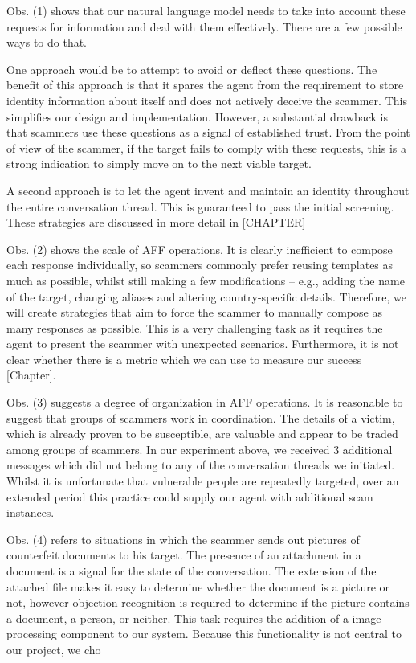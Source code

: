 Obs. (1) shows that our natural language model needs to take into account these requests for information and deal with them effectively. There are a few possible ways to do that. 

One approach would be to attempt to avoid or deflect these questions. The benefit of this approach is that it spares the agent from the requirement to store identity information about itself and does not actively deceive the scammer. This simplifies our design and implementation. However, a substantial drawback is that scammers use these questions as a signal of established trust. From the point of view of the scammer, if the target fails to comply with these requests, this is a strong indication to simply move on to the next viable target. 

A second approach is to let the agent invent and maintain an identity throughout the entire conversation thread. This is guaranteed to pass the initial screening. These strategies are discussed in more detail in [CHAPTER]

Obs. (2) shows the scale of AFF operations. It is clearly inefficient to compose each response individually, so scammers commonly prefer reusing templates as much as possible, whilst still making a few modifications -- e.g., adding the name of the target, changing aliases and altering country-specific details. Therefore, we will create strategies that aim to force the scammer to manually compose as many responses as possible. This is a very challenging task as it requires the agent to present the scammer with unexpected scenarios. Furthermore, it is not clear whether there is a metric which we can use to measure our success [Chapter].

Obs. (3) suggests a degree of organization in AFF operations. It is reasonable to suggest that groups of scammers work in coordination. The details of a victim, which is already proven to be susceptible, are valuable and appear to be traded among groups of scammers. In our experiment above, we received 3 additional messages which did not belong to any of the conversation threads we initiated. Whilst it is unfortunate that vulnerable people are repeatedly targeted, over an extended period this practice could supply our agent with additional scam instances. 

Obs. (4) refers to situations in which the scammer sends out pictures of counterfeit documents to his target. The presence of an attachment in a document is a signal for the state of the conversation. The extension of the attached file makes it easy to determine whether the document is a picture or not, however objection recognition is required to determine if the picture contains a document, a person,  or neither. This task requires the addition of a image processing component to our system. Because this functionality is not central to our project, we cho

